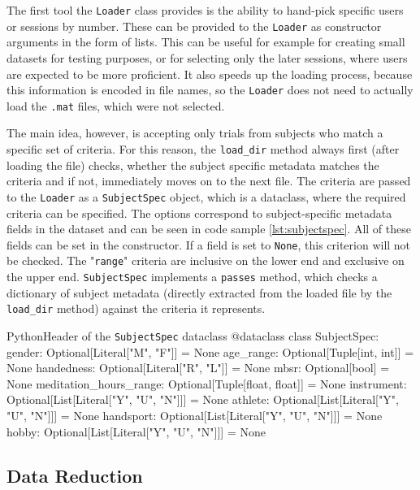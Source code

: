 \documentclass[english, he, bc, kiv, iso690alph]{fasthesis}
\begin{document}
The first tool the \texttt{Loader} class provides is the ability to hand-pick specific users or sessions by number. These can be provided to the \texttt{Loader} as constructor arguments in the form of lists. This can be useful for example for creating small datasets for testing purposes, or for selecting only the later sessions, where users are expected to be more proficient. It also speeds up the loading process, because this information is encoded in file names, so the \texttt{Loader} does not need to actually load the \texttt{.mat} files, which were not selected.

The main idea, however, is accepting only trials from subjects who match a specific set of criteria. For this reason, the \texttt{load\_dir} method always first (after loading the file) checks, whether the subject specific metadata matches the criteria and if not, immediately moves on to the next file. The criteria are passed to the \texttt{Loader} as a \texttt{SubjectSpec} object, which is a dataclass, where the required criteria can be specified. The options correspond to subject-specific metadata fields in the dataset and can be seen in code sample \ref{lst:subjectspec}. All of these fields can be set in the constructor. If a field is set to \texttt{None}, this criterion will not be checked. The "\texttt{range}" criteria are inclusive on the lower end and exclusive on the upper end. \texttt{SubjectSpec} implements a \texttt{passes} method, which checks a dictionary of subject metadata (directly extracted from the loaded file by the \texttt{load\_dir} method) against the criteria it represents.

\begin{code}{Python}{Header of the \texttt{SubjectSpec} dataclass\label{lst:subjectspec}}
	@dataclass
	class SubjectSpec:
	gender: Optional[Literal["M", "F"]] = None
	age_range: Optional[Tuple[int, int]] = None
	handedness: Optional[Literal["R", "L"]] = None
	mbsr: Optional[bool] = None
	meditation_hours_range: Optional[Tuple[float, float]] = None
	instrument: Optional[List[Literal["Y", "U", "N"]]] = None
	athlete: Optional[List[Literal["Y", "U", "N"]]] = None
	handsport: Optional[List[Literal["Y", "U", "N"]]] = None
	hobby: Optional[List[Literal["Y", "U", "N"]]] = None
\end{code}

\subsection{Data Reduction}
\end{document}
